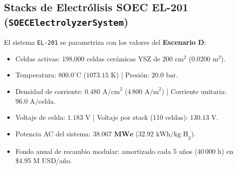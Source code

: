 \documentclass[11pt,letterpaper]{article}
\begin{document}
\subsection{Stacks de Electrólisis SOEC EL-201 (\texttt{SOECElectrolyzerSystem})}
El sistema \texttt{EL-201} se parametriza con los valores del \textbf{Escenario D}:
\begin{itemize}
    \item Celdas activas: 198,000 celdas cerámicas YSZ de $200\text{ cm}^2$ ($0.0200\text{ m}^2$).
    \item Temperatura: $800.0^\circ\text{C}$ ($1073.15\text{ K}$) | Presión: $20.0\text{ bar}$.
    \item Densidad de corriente: $0.480\text{ A/cm}^2$ ($4\,800\text{ A/m}^2$) | Corriente unitaria: $96.0\text{ A/celda}$.
    \item Voltaje de celda: $1.183\text{ V}$ | Voltaje por stack (110 celdas): $130.13\text{ V}$.
    \item Potencia AC del sistema: $\mathbf{38.067\text{ MWe}}$ ($32.92\text{ kWh/kg H}_2$).
    \item Fondo anual de recambio modular: amortizado cada 5 años ($40\,000\text{ h}$) en \$4.95 M USD/año.
\end{itemize}
\end{document}
